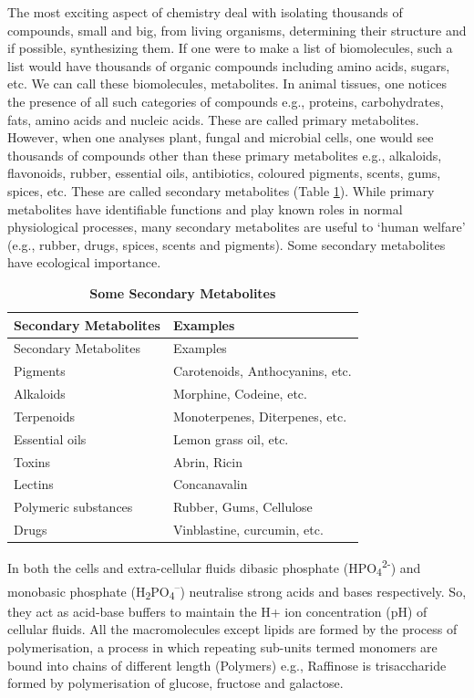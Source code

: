 \documentclass[
]{book}
\begin{document}
The most exciting aspect of chemistry deal with isolating thousands of compounds, small and big, from living organisms, determining their structure and if possible, synthesizing them. If one were to make a list of biomolecules, such a list would have thousands of organic compounds including amino acids, sugars, etc. We can call these biomolecules, metabolites. In animal tissues, one notices the presence of all such categories of compounds e.g., proteins, carbohydrates, fats, amino acids and nucleic acids. These are called primary metabolites. However, when one analyses plant, fungal and microbial cells, one would see thousands of compounds other than these primary metabolites e.g., alkaloids, flavonoids, rubber, essential oils, antibiotics, coloured pigments, scents, gums, spices, etc. These are called secondary metabolites (Table \ref{tab:t1}). While primary metabolites have identifiable functions and play known roles in normal physiological processes, many secondary metabolites are useful to `human welfare' (e.g., rubber, drugs, spices, scents and pigments). Some secondary metabolites have ecological importance.

\begin{longtable}[]{@{}ll@{}}
\caption{\textbf{\label{tab:t1} Some Secondary Metabolites}}\tabularnewline
\toprule
Secondary Metabolites & Examples \\
\midrule
\endfirsthead
\toprule
Secondary Metabolites & Examples \\
\midrule
\endhead
Pigments & Carotenoids, Anthocyanins, etc. \\
Alkaloids & Morphine, Codeine, etc. \\
Terpenoids & Monoterpenes, Diterpenes, etc. \\
Essential oils & Lemon grass oil, etc. \\
Toxins & Abrin, Ricin \\
Lectins & Concanavalin \\
Polymeric substances & Rubber, Gums, Cellulose \\
Drugs & Vinblastine, curcumin, etc. \\
\bottomrule
\end{longtable}

In both the cells and extra-cellular fluids dibasic phosphate (HPO\textsubscript{4}\textsuperscript{2-}) and monobasic phosphate (H\textsubscript{2}PO\textsubscript{4}\textsuperscript{--}) neutralise strong acids and bases respectively. So, they act as acid-base buffers to maintain the H+ ion concentration (pH) of cellular fluids. All the macromolecules except lipids are formed by the process of polymerisation, a process in which repeating sub-units termed monomers are bound into chains of different length (Polymers) e.g., Raffinose is trisaccharide formed by polymerisation of glucose, fructose and galactose.
\end{document}
